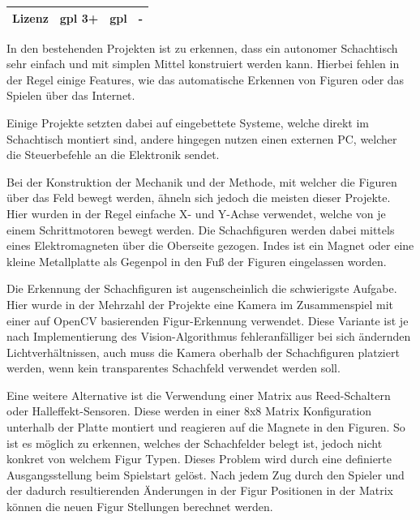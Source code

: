 \begin{longtable}[]{@{}llll@{}}
\begin{minipage}[t]{0.19\columnwidth}\raggedright
Lizenz\strut
\end{minipage} & \begin{minipage}[t]{0.25\columnwidth}\raggedright
\gls{gpl} 3+\strut
\end{minipage} & \begin{minipage}[t]{0.26\columnwidth}\raggedright
\gls{gpl}\strut
\end{minipage} & \begin{minipage}[t]{0.19\columnwidth}\raggedright
-\strut
\end{minipage}\tabularnewline
\bottomrule
\end{longtable}

In den bestehenden Projekten ist zu erkennen, dass ein autonomer
Schachtisch sehr einfach und mit simplen Mittel konstruiert werden kann.
Hierbei fehlen in der Regel einige Features, wie das automatische
Erkennen von Figuren oder das Spielen über das Internet.

Einige Projekte setzten dabei auf eingebettete Systeme, welche direkt im
Schachtisch montiert sind, andere hingegen nutzen einen externen PC,
welcher die Steuerbefehle an die Elektronik sendet.

Bei der Konstruktion der Mechanik und der Methode, mit welcher die
Figuren über das Feld bewegt werden, ähneln sich jedoch die meisten
dieser Projekte. Hier wurden in der Regel einfache X- und Y-Achse
verwendet, welche von je einem Schrittmotoren bewegt werden. Die
Schachfiguren werden dabei mittels eines Elektromagneten über die
Oberseite gezogen. Indes ist ein Magnet oder eine kleine Metallplatte
als Gegenpol in den Fuß der Figuren eingelassen worden.

Die Erkennung der Schachfiguren ist augenscheinlich die schwierigste
Aufgabe. Hier wurde in der Mehrzahl der Projekte eine Kamera im
Zusammenspiel mit einer auf OpenCV basierenden Figur-Erkennung
verwendet. Diese Variante ist je nach Implementierung des
Vision-Algorithmus fehleranfälliger bei sich ändernden
Lichtverhältnissen, auch muss die Kamera oberhalb der Schachfiguren
platziert werden, wenn kein transparentes Schachfeld verwendet werden
soll.

Eine weitere Alternative ist die Verwendung einer Matrix aus
Reed-Schaltern oder Halleffekt-Sensoren. Diese werden in einer 8x8
Matrix Konfiguration unterhalb der Platte montiert und reagieren auf die
Magnete in den Figuren. So ist es möglich zu erkennen, welches der
Schachfelder belegt ist, jedoch nicht konkret von welchem Figur Typen.
Dieses Problem wird durch eine definierte Ausgangsstellung beim
Spielstart gelöst. Nach jedem Zug durch den Spieler und der dadurch
resultierenden Änderungen in der Figur Positionen in der Matrix können
die neuen Figur Stellungen berechnet werden.

